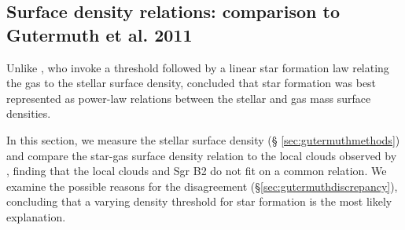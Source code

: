\documentclass[twocolumn]{aastex61}
\begin{document}
% 
% 

\subsection{Surface density relations: comparison to Gutermuth et al. 2011}
\label{sec:gutermuth}
Unlike \citet{Lada2010a}, who invoke a threshold followed by a linear star
formation law relating the gas to the stellar surface density,
\citet{Gutermuth2011a} concluded that star formation was best represented as
power-law relations between the stellar and gas mass surface densities.

In this section, we measure the stellar surface density (\S
\ref{sec:gutermuthmethods}) and compare the star-gas surface density relation
to the local clouds observed by \citet[][\S
\ref{sec:gutermuthcomparison}]{Gutermuth2011a}, finding that the local clouds
and Sgr B2 do not fit on a common relation.  We examine the possible reasons
for the disagreement (\S \ref{sec:gutermuthdiscrepancy}), concluding that a
varying density threshold for star formation is the most likely explanation.
\end{document}
